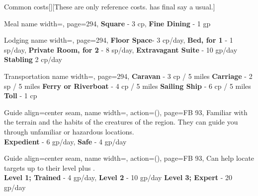 \begin{PageBack}
\begin{Tables}{\backTableHeight}
\begin{Table}{Common costs}[][These are only reference costs. \GM has final say a usual.]
\begin{entry}{Meal}{%
                name width=\turnLength,%
                page=294,
            }
                \textbf{Square} - 3 cp, \quad
                \textbf{Fine Dining} - 1 gp \quad
            \end{entry}
            \begin{entry}{Lodging}{%
                name width=\turnLength,%
                page=294,
            }
                \textbf{Floor Space}- 3 cp/day, \hfill
                \textbf{Bed, for 1} - 1 sp/day, \hfill
                \textbf{Private Room, for 2} - 8 sp/day, \hfill
                \textbf{Extravagant Suite} - 10 gp/day \hfill\vline\hfill \textbf{Stabling} 2 cp/day
            \end{entry}
            \begin{entry}{Transportation}{%
                name width=\turnLength,%
                page=294,
            }%
                \textbf{Caravan} - 3 cp / 5 miles\hfill
                \textbf{Carriage} - 2 sp / 5 miles\hfill
                \textbf{Ferry or Riverboat} - 4 cp / 5 miles\hfill
                \textbf{Sailing Ship} - 6 cp / 5 miles \hfill\vline\hfill
                \textbf{Toll} - 1 cp
            \end{entry}
            \breakLine[Help]
            \begin{entry}{Guide }{%
                align=center seam,
                name width=\turnLength,%
                action={\BodyFont ()},
                page=FB 93,
            }%
                Familiar with the terrain and the habits of the creatures of the region.
                They can guide you through unfamiliar or hazardous locations.\\
                \textbf{Expedient} - 6 gp/day,\quad
                \textbf{Safe} - 4 gp/day 
            \end{entry}
            \begin{entry}{Guide }{%
                align=center seam,
                name width=\turnLength,%
                action={\BodyFont ()},
                page=FB 93,
            }
                Can help locate targets up to their level plus . \hfill
                \\
                \textbf{Level 1; Trained} - 4 gp/day, \hfill
                \textbf{Level 2} - 10 gp/day\hfill
                \textbf{Level 3; Expert} - 20 gp/day\hfill

\end{entry}
\end{Table}
\end{Tables}
\end{PageBack}
